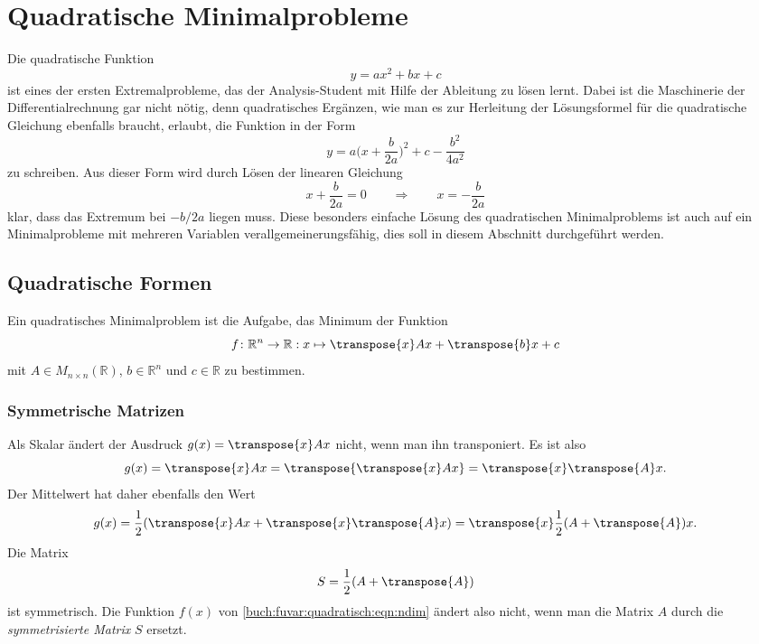 %
%
%
\section{Quadratische Minimalprobleme
\label{buch:fuvar:section:quadratisch}}
Die quadratische Funktion
\begin{equation}
y
=
ax^2 + bx + c
\label{buch:fuvar:quadratisch:eqn:1dim}
\end{equation}
ist eines der ersten Extremalprobleme, das der Analysis-Student mit
Hilfe der Ableitung zu lösen lernt.
Dabei ist die Maschinerie der Differentialrechnung gar nicht nötig,
denn quadratisches Ergänzen, wie man es zur Herleitung der Lösungsformel
für die quadratische Gleichung ebenfalls braucht, erlaubt, die Funktion
in der Form
\[
y
=
a\biggl(x+\frac{b}{2a}\biggr)^2
+c
-\frac{b^2}{4a^2}
\]
zu schreiben.
Aus dieser Form wird durch Lösen der linearen Gleichung
\[
x+\frac{b}{2a} = 0
\qquad\Rightarrow\qquad
x = -\frac{b}{2a}
\]
klar, dass das Extremum bei $-b/2a$ liegen muss.
Diese besonders einfache Lösung des quadratischen Minimalproblems
ist auch auf ein Minimalprobleme mit mehreren Variablen
verallgemeinerungsfähig, dies soll in diesem Abschnitt durchgeführt
werden.

%
%
\subsection{Quadratische Formen}
Ein quadratisches Minimalproblem ist die Aufgabe, das Minimum der
Funktion
\begin{equation}
f
\colon
\mathbb{R}^n \to \mathbb{R}
:
x\mapsto \transpose{x} A x + \transpose{b} x + c
\label{buch:fuvar:quadratisch:eqn:ndim}
\end{equation}
mit $A\in M_{n\times n}(\mathbb{R})$, $b\in\mathbb{R}^n$ und $c\in\mathbb{R}$
zu bestimmen.

%
%
\subsubsection{Symmetrische Matrizen}
Als Skalar ändert der Ausdruck $g(x) = \transpose{x}Ax$  nicht, wenn man ihn
transponiert.
Es ist also
\[
g(x)
=
\transpose{x}Ax
=
\transpose{\transpose{x}Ax}
=
\transpose{x}\transpose{A}x.
\]
Der Mittelwert hat daher ebenfalls den Wert
\[
g(x)
=
\frac12(\transpose{x}Ax+\transpose{x}\transpose{A}x)
=
\transpose{x}\frac12(A+\transpose{A})x.
\]
Die Matrix
\[
S=\frac12(A+\transpose{A})
\]
ist symmetrisch.
Die Funktion $f(x)$ von \eqref{buch:fuvar:quadratisch:eqn:ndim}
ändert also nicht, wenn man die Matrix $A$ durch die {\em symmetrisierte
Matrix} $S$ ersetzt.

